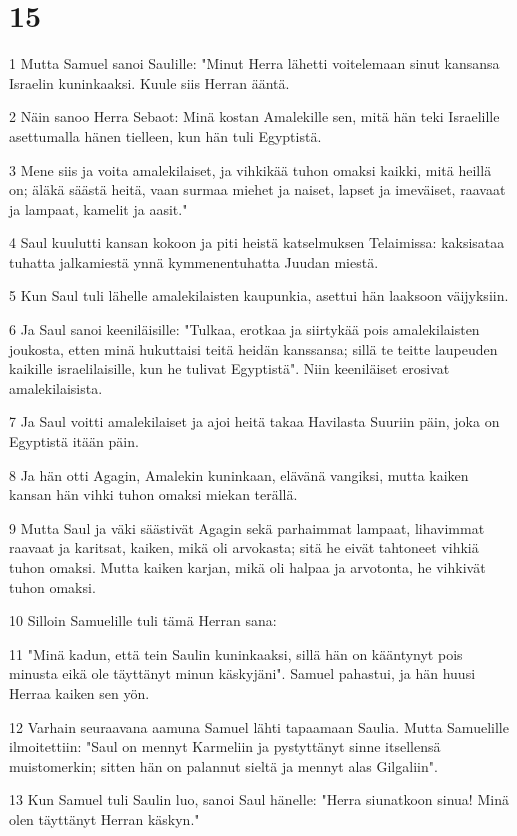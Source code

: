 \chapter{15}

\par 1 Mutta Samuel sanoi Saulille: "Minut Herra lähetti voitelemaan sinut kansansa Israelin kuninkaaksi. Kuule siis Herran ääntä.
\par 2 Näin sanoo Herra Sebaot: Minä kostan Amalekille sen, mitä hän teki Israelille asettumalla hänen tielleen, kun hän tuli Egyptistä.
\par 3 Mene siis ja voita amalekilaiset, ja vihkikää tuhon omaksi kaikki, mitä heillä on; äläkä säästä heitä, vaan surmaa miehet ja naiset, lapset ja imeväiset, raavaat ja lampaat, kamelit ja aasit."
\par 4 Saul kuulutti kansan kokoon ja piti heistä katselmuksen Telaimissa: kaksisataa tuhatta jalkamiestä ynnä kymmenentuhatta Juudan miestä.
\par 5 Kun Saul tuli lähelle amalekilaisten kaupunkia, asettui hän laaksoon väijyksiin.
\par 6 Ja Saul sanoi keeniläisille: "Tulkaa, erotkaa ja siirtykää pois amalekilaisten joukosta, etten minä hukuttaisi teitä heidän kanssansa; sillä te teitte laupeuden kaikille israelilaisille, kun he tulivat Egyptistä". Niin keeniläiset erosivat amalekilaisista.
\par 7 Ja Saul voitti amalekilaiset ja ajoi heitä takaa Havilasta Suuriin päin, joka on Egyptistä itään päin.
\par 8 Ja hän otti Agagin, Amalekin kuninkaan, elävänä vangiksi, mutta kaiken kansan hän vihki tuhon omaksi miekan terällä.
\par 9 Mutta Saul ja väki säästivät Agagin sekä parhaimmat lampaat, lihavimmat raavaat ja karitsat, kaiken, mikä oli arvokasta; sitä he eivät tahtoneet vihkiä tuhon omaksi. Mutta kaiken karjan, mikä oli halpaa ja arvotonta, he vihkivät tuhon omaksi.
\par 10 Silloin Samuelille tuli tämä Herran sana:
\par 11 "Minä kadun, että tein Saulin kuninkaaksi, sillä hän on kääntynyt pois minusta eikä ole täyttänyt minun käskyjäni". Samuel pahastui, ja hän huusi Herraa kaiken sen yön.
\par 12 Varhain seuraavana aamuna Samuel lähti tapaamaan Saulia. Mutta Samuelille ilmoitettiin: "Saul on mennyt Karmeliin ja pystyttänyt sinne itsellensä muistomerkin; sitten hän on palannut sieltä ja mennyt alas Gilgaliin".
\par 13 Kun Samuel tuli Saulin luo, sanoi Saul hänelle: "Herra siunatkoon sinua! Minä olen täyttänyt Herran käskyn."
